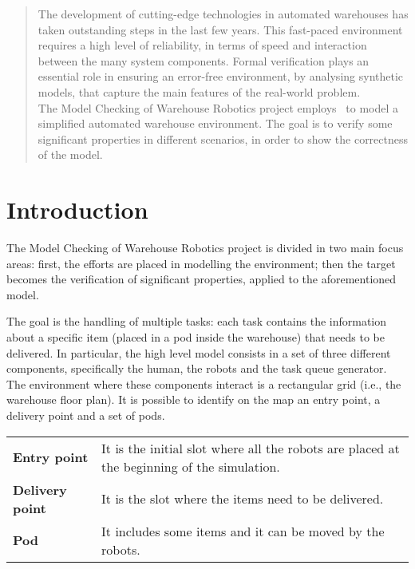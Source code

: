 \begin{abstract}
The development of cutting-edge technologies in automated warehouses has taken outstanding steps in the last few years. 
This fast-paced environment requires a high level of reliability, in terms of speed and interaction between the many system components.
Formal verification plays an essential role in ensuring an error-free environment, by analysing synthetic models, that capture the main features of the real-world problem.\\
The Model Checking of Warehouse Robotics project employs \UPPAAL \ to model a simplified automated warehouse environment. The goal is to verify some significant properties in different scenarios, in order to show the correctness of the model.
\end{abstract}

\section{Introduction}
The Model Checking of Warehouse Robotics project is divided in two main focus areas: first, the efforts are placed in modelling the environment; then the target becomes the verification of significant properties, applied to the aforementioned model.

The goal is the handling of multiple tasks: each task contains the information about a specific item (placed in a pod inside the warehouse) that needs to be delivered. 
In particular, the high level model consists in a set of three different components, specifically the human, the robots and the task queue generator.
The environment where these components interact is a rectangular grid (i.e., the warehouse floor plan). It is possible to identify on the map an entry point, a delivery point and a set of pods.

\begin{tabularx}{\textwidth}{lX}
\textbf{Entry point} & It is the initial slot where all the robots are placed at the beginning of the simulation.\vspace{0,2cm}\\
\textbf{Delivery point} & It is the slot where the items need to be delivered.\vspace{0,2cm}\\
\textbf{Pod} & It includes some items and it can be moved by the robots.\vspace{0,2cm}\\
\end{tabularx}

